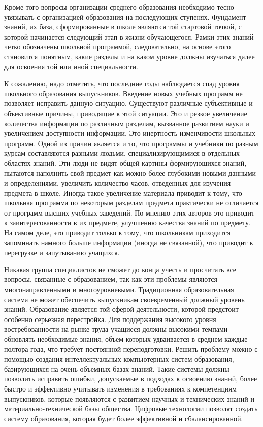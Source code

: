 Кроме того вопросы организации среднего образования необходимо тесно увязывать с организацией образования на последующих ступенях. Фундамент знаний, их база, сформированные в школе являются той стартовой точкой, с которой начинается следующий этап в жизни обучающегося. Рамки этих знаний четко обозначены школьной программой, следовательно, на основе этого становится понятным, какие разделы и на каком уровне должны изучаться далее для освоения той или иной специальности.

К сожалению, надо отметить, что последние годы наблюдается спад уровня школьного образования выпускников. Введение новых учебных программ не позволяет исправить данную ситуацию. Существуют различные субъективные и объективные причины, приводящие к этой ситуации. Это и резкое увеличение количества информации по различным разделам, вызванное развитием науки и увеличением доступности информации. Это инертность изменчивости школьных программ. Одной из причин является и то, что программы и учебники по разным курсам составляются разными людьми, специализирующимися в отдельных областях знаний. Эти люди не видят общей картины формирующихся знаний, пытаются наполнить свой предмет как можно более глубокими новыми данными и определениями, увеличить количество часов, отведенных для изучения предмета в школе. Иногда такое увеличение материала приводит к тому, что школьная программа по некоторым разделам предмета практически не отличается от программ высших учебных заведений. По мнению этих авторов это приводит к заинтересованности в их предмете, улучшению качества знаний по предмету. На самом деле, это приводит только к тому, что школьникам приходится запоминать намного больше информации (иногда не связанной), что приводит к перегрузке и запутыванию учащихся.

Никакая группа специалистов не сможет до конца учесть и просчитать все вопросы, связанные с образованием, так как эти проблемы являются многонаправленными и многоуровневыми. Традиционная образовательная система не может обеспечить выпускникам своевременный должный уровень знаний. Образование является той сферой деятельности, которой предстоит особенно серьезная перестройка. Для поддержания высокого уровня востребованности на рынке труда учащиеся должны высокими темпами обновлять необходимые знания, объем которых удваивается в среднем каждые полтора года, что требует постоянной переподготовки. Решить проблему можно с помощью создания интеллектуальных компьютерных систем образования, базирующихся на очень объемных базах знаний. Такие системы должны позволить исправить ошибки, допускаемые в подходах к освоению знаний, более быстро и эффективно учитывать изменения в требованиях к компетенциям выпускников, которые появляются с развитием научных и технических знаний и материально-технической базы общества. Цифровые технологии позволят создать систему образования, которая будет более эффективной и сбалансированной. 

